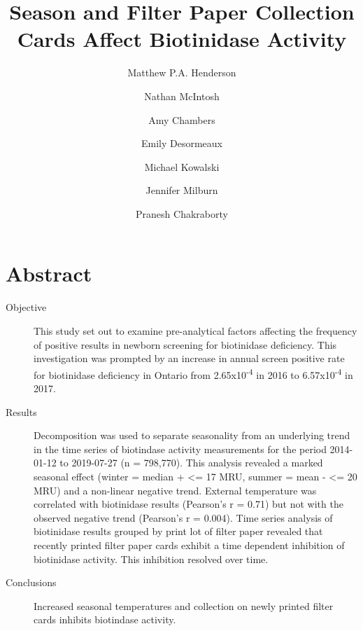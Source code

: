 \documentclass[review]{elsarticle}
\date{}
\title{}
\begin{document}
\makeatletter
\newcommand{\citeprocitem}[2]{\hyper@linkstart{cite}{citeproc_bib_item_#1}#2\hyper@linkend}
\makeatother



\begin{frontmatter}
\title{Season and Filter Paper Collection Cards Affect Biotinidase Activity}
\author[NSO]{Matthew P.A. Henderson}
\author[NSO]{Nathan McIntosh}
\author[NSO]{Amy Chambers}
\author[NSO]{Emily Desormeaux}
\author[NSO]{Michael Kowalski}
\author[NSO]{Jennifer Milburn}
\author[NSO]{Pranesh Chakraborty}
\address[NSO]{Newborn Screening Ontario, Children's Hospital of Eastern Ontario, 415 Smyth Rd, Ottawa Ontario}
\end{frontmatter}

\section*{Abstract}
\label{sec:orga250e34}
\begin{description}
\item[{Objective}] This study set out to examine pre-analytical factors
affecting the frequency of positive results in newborn screening for
biotinidase deficiency. This investigation was prompted by an
increase in annual screen positive rate for biotinidase deficiency
in Ontario from 2.65x10\textsuperscript{-4} in 2016 to 6.57x10\textsuperscript{-4} in 2017.

\item[{Results}] Decomposition was used to separate seasonality from an
underlying trend in the time series of biotindase activity
measurements for the period 2014-01-12 to 2019-07-27 (n =
798,770). This analysis revealed a marked seasonal effect (winter =
median + <= 17 MRU, summer = mean - <= 20 MRU) and a non-linear
negative trend. External temperature was correlated with biotinidase
results (Pearson's r = 0.71) but not with the observed negative
trend (Pearson's r = 0.004). Time series analysis of biotinidase
results grouped by print lot of filter paper revealed that recently
printed filter paper cards exhibit a time dependent inhibition of
biotinidase activity. This inhibition resolved over time.

\item[{Conclusions}] Increased seasonal temperatures and collection on
newly printed filter cards inhibits biotindase activity.
\end{description}
\end{document}
